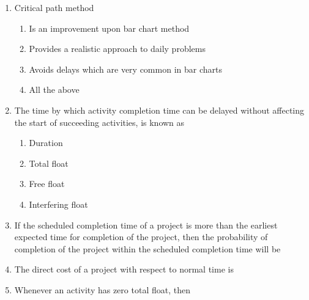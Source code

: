 \documentclass[11pt,a4paper]{article}
\begin{document}
\begin{enumerate}
\item{Critical path method}
\begin{enumerate}[label=\Alph*.]
\item{Is an improvement upon bar chart method}
\item{Provides a realistic approach to daily problems}
\item{Avoids delays which are very common in bar charts}
\item{All the above}
\end{enumerate}
\item{The time by which activity completion time can be delayed without affecting the start of succeeding activities, is known as}
\begin{enumerate}[label=\Alph*.]
\item{Duration}
\item{Total float}
\item{Free float}
\item{Interfering float}
\end{enumerate}
\item{If the scheduled completion time of a project is more than the earliest expected time for completion of the project, then the probability of completion of the project within the scheduled completion time will be}
\\
\item{The direct cost of a project with respect to normal time is}
\\
\item{Whenever an activity has zero total float, then}
\begin{enumerate}[label=\Alph*.]

\end{enumerate}
\end{enumerate}
\end{document}
